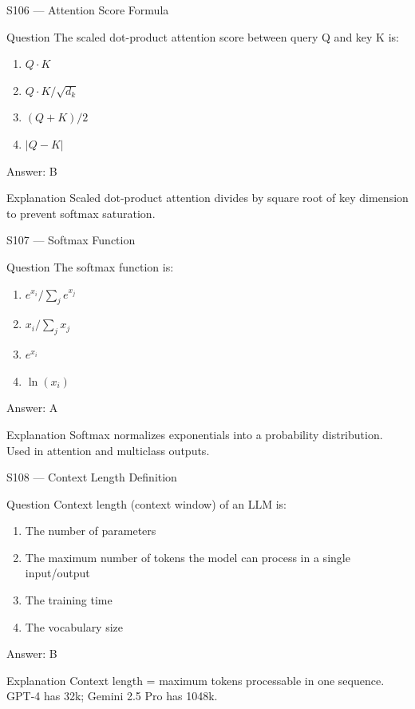 \documentclass[aspectratio=169,8pt]{beamer}
\begin{document}
	\begin{frame}{S106 --- Attention Score Formula}
		\begin{block}{Question}
			The scaled dot-product attention score between query Q and key K is:
			\begin{enumerate}
				\item $Q \cdot K$
				\item $Q \cdot K / \sqrt{d_k}$
				\item $(Q + K)/2$
				\item $|Q - K|$
			\end{enumerate}
		\end{block}
		\begin{exampleblock}{Answer: B}\end{exampleblock}
		\begin{block}{Explanation}
			Scaled dot-product attention divides by square root of key dimension to prevent softmax saturation.
		\end{block}
	\end{frame}
	
	\begin{frame}{S107 --- Softmax Function}
		\begin{block}{Question}
			The softmax function is:
			\begin{enumerate}
				\item $e^{x_i}/\sum_j e^{x_j}$
				\item $x_i/\sum_j x_j$
				\item $e^{x_i}$
				\item $\ln(x_i)$
			\end{enumerate}
		\end{block}
		\begin{exampleblock}{Answer: A}\end{exampleblock}
		\begin{block}{Explanation}
			Softmax normalizes exponentials into a probability distribution. Used in attention and multiclass outputs.
		\end{block}
	\end{frame}
	
	\begin{frame}{S108 --- Context Length Definition}
		\begin{block}{Question}
			Context length (context window) of an LLM is:
			\begin{enumerate}
				\item The number of parameters
				\item The maximum number of tokens the model can process in a single input/output
				\item The training time
				\item The vocabulary size
			\end{enumerate}
		\end{block}
		\begin{exampleblock}{Answer: B}\end{exampleblock}
		\begin{block}{Explanation}
			Context length = maximum tokens processable in one sequence. GPT-4 has 32k; Gemini 2.5 Pro has 1048k.
		\end{block}
	\end{frame}
	
\end{document}
